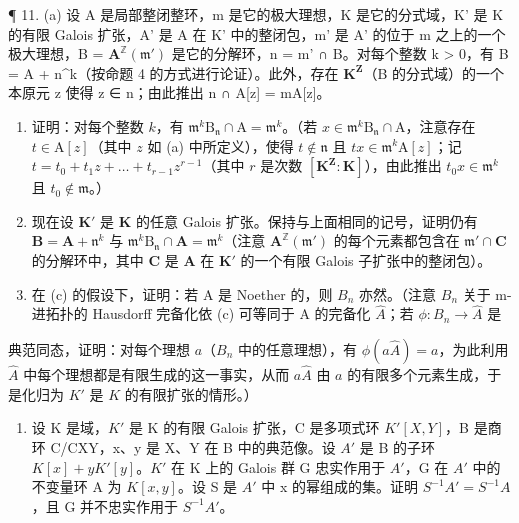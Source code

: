 ¶ 11. (a) 设 A 是局部整闭整环，m 是它的极大理想，K 是它的分式域，K' 是 K 的有限 Galois 扩张，A' 是 A 在 K' 中的整闭包，m' 是 A' 的位于 m 之上的一个极大理想，B = \(\mathbf{A}^{\mathbb{Z}}(\mathfrak{m}')\) 是它的分解环，n = m' ∩ B。对每个整数 k \textgreater{} 0，有 B = A + n\^{}k（按命题 4 的方式进行论证）。此外，存在 \(\mathbf{K}^{\mathbf{Z}}\)（B 的分式域）的一个本原元 z 使得 z ∈ n；由此推出 n ∩ A{[}z{]} = mA{[}z{]}。

\begin{enumerate}
\def\labelenumi{(\alph{enumi})}
\setcounter{enumi}{1}
\item
  证明：对每个整数 \(k\)，有 \(\mathfrak{m}^k\mathrm{B}_{\mathfrak{n}} \cap \mathrm{A} = \mathfrak{m}^k\)。（若 \(x \in \mathfrak{m}^k\mathrm{B}_{\mathfrak{n}} \cap \mathrm{A}\)，注意存在 \(t \in \mathrm{A}[z]\)（其中 \(z\) 如 (a) 中所定义），使得 \(t \notin \mathfrak{n}\) 且 \(tx \in \mathfrak{m}^k\mathrm{A}[z]\)；记 \(t = t_0 + t_1z + \dots + t_{r-1}z^{r-1}\)（其中 \(r\) 是次数 \([\mathbf{K}^{\mathbf{Z}}: \mathbf{K}]\)），由此推出 \(t_0x \in \mathfrak{m}^k\) 且 \(t_0 \notin \mathfrak{m}\)。）
\item
  现在设 \(\mathbf{K}'\) 是 \(\mathbf{K}\) 的任意 Galois 扩张。保持与上面相同的记号，证明仍有 \(\mathbf{B} = \mathbf{A} + \mathfrak{n}^k\) 与 \(\mathfrak{m}^k\mathrm{B}_{\mathfrak{n}} \cap \mathbf{A} = \mathfrak{m}^k\)（注意 \(\mathbf{A}^{\mathbb{Z}}(\mathfrak{m}')\) 的每个元素都包含在 \(\mathfrak{m}' \cap \mathbf{C}\) 的分解环中，其中 \(\mathbf{C}\) 是 \(\mathbf{A}\) 在 \(\mathbf{K}'\) 的一个有限 Galois 子扩张中的整闭包）。
\item
  在 (c) 的假设下，证明：若 A 是 Noether 的，则 \(B_{n}\) 亦然。（注意 \(B_{n}\) 关于 m-进拓扑的 Hausdorff 完备化依 (c) 可等同于 A 的完备化 \(\hat{A}\)；若 \(\phi: B_{n} \rightarrow \hat{A}\) 是
\end{enumerate}

典范同态，证明：对每个理想 \(a\)（\(B_n\) 中的任意理想），有 \(\phi(a\hat{A}) = a\)，为此利用 \(\hat{A}\) 中每个理想都是有限生成的这一事实，从而 \(a\hat{A}\) 由 \(a\) 的有限多个元素生成，于是化归为 \(K'\) 是 \(K\) 的有限扩张的情形。）

\begin{enumerate}
\def\labelenumi{\arabic{enumi}.}
\setcounter{enumi}{11}
\tightlist
\item
  设 K 是域，\(K'\) 是 K 的有限 Galois 扩张，C 是多项式环 \(K'[X, Y]\)，B 是商环 C/CXY，x、y 是 X、Y 在 B 中的典范像。设 \(A'\) 是 B 的子环 \(K[x] + yK'[y]\)。\(K'\) 在 K 上的 Galois 群 G 忠实作用于 \(A'\)，G 在 \(A'\) 中的不变量环 A 为 \(K[x, y]\)。设 S 是 \(A'\) 中 x 的幂组成的集。证明 \(S^{-1}A' = S^{-1}A\)，且 G 并不忠实作用于 \(S^{-1}A'\)。
\end{enumerate}

